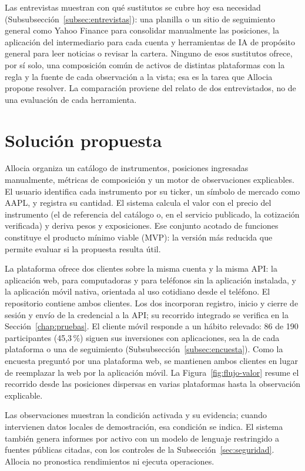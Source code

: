 Las entrevistas muestran con qué sustitutos se cubre hoy esa necesidad (Subsubsección~\ref{subsec:entrevistas}): una planilla o un sitio de seguimiento general como Yahoo Finance para consolidar manualmente las posiciones, la aplicación del intermediario para cada cuenta y herramientas de IA de propósito general para leer noticias o revisar la cartera. Ninguno de esos sustitutos ofrece, por sí solo, una composición común de activos de distintas plataformas con la regla y la fuente de cada observación a la vista; esa es la tarea que Allocia propone resolver. La comparación proviene del relato de dos entrevistados, no de una evaluación de cada herramienta.

\section{Solución propuesta}\label{sec:solucion}

Allocia organiza un catálogo de instrumentos, posiciones ingresadas manualmente, métricas de composición y un motor de observaciones explicables. El usuario identifica cada instrumento por su ticker, un símbolo de mercado como AAPL, y registra su cantidad. El sistema calcula el valor con el precio del instrumento (el de referencia del catálogo o, en el servicio publicado, la cotización verificada) y deriva pesos y exposiciones. Ese conjunto acotado de funciones constituye el producto mínimo viable (MVP): la versión más reducida que permite evaluar si la propuesta resulta útil.

La plataforma ofrece dos clientes sobre la misma cuenta y la misma API: la aplicación web, para computadoras y para teléfonos sin la aplicación instalada, y la aplicación móvil nativa, orientada al uso cotidiano desde el teléfono. El repositorio contiene ambos clientes. Los dos incorporan registro, inicio y cierre de sesión y envío de la credencial a la API; su recorrido integrado se verifica en la Sección~\ref{chap:pruebas}. El cliente móvil responde a un hábito relevado: 86 de 190 participantes (45,3\,\%) siguen sus inversiones con aplicaciones, sea la de cada plataforma o una de seguimiento (Subsubsección~\ref{subsec:encuesta}). Como la encuesta preguntó por una plataforma web, se mantienen ambos clientes en lugar de reemplazar la web por la aplicación móvil. La Figura~\ref{fig:flujo-valor} resume el recorrido desde las posiciones dispersas en varias plataformas hasta la observación explicable.


Las observaciones muestran la condición activada y su evidencia; cuando intervienen datos locales de demostración, esa condición se indica. El sistema también genera informes por activo con un modelo de lenguaje restringido a fuentes públicas citadas, con los controles de la Subsección~\ref{sec:seguridad}. Allocia no pronostica rendimientos ni ejecuta operaciones.

